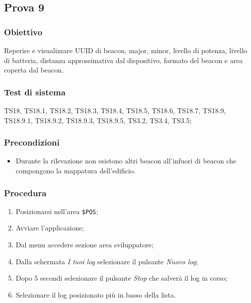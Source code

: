 \documentclass[../Sperimentazione.tex]{subfiles}
\begin{document}
\newpage	
\subsection{Prova 9} %
\label{subsec:Prova9}	
	
	\subsubsection{Obiettivo}
		Reperire e visualizzare UUID di beacon, major, minor, livello di potenza, livello di batteria, distanza approssimativa dal dispositivo, formato del beacon e area coperta dal beacon.
		
	\subsubsection{Test di sistema}
		TS18, TS18.1, TS18.2, TS18.3, TS18.4, TS18.5, TS18.6, TS18.7,
		TS18.9, TS18.9.1, TS18.9.2, TS18.9.3, TS18.9.5,
		TS3.2, TS3.4, TS3.5;
		
	\subsubsection{Precondizioni}
		\begin{itemize}
			\item Durante la rilevazione non esistono altri beacon all'infuori di beacon che compongono la mappatura dell'edificio.
		\end{itemize}				
		
	\subsubsection{Procedura}
		\begin{enumerate}
		\item Posizionarsi nell'area \verb|$POS|;
		\item Avviare l'applicazione;
		\item Dal menu accedere sezione area sviluppatore;
		\item Dalla schermata \textit{I tuoi log} selezionare il pulsante \textit{Nuovo log};
		\item Dopo 5 secondi selezionare il pulsante \textit{Stop}  che salverà il log in corso;
		\item Selezionare il log posizionato più in basso della lista.
		\end{enumerate}
		
\end{document}
